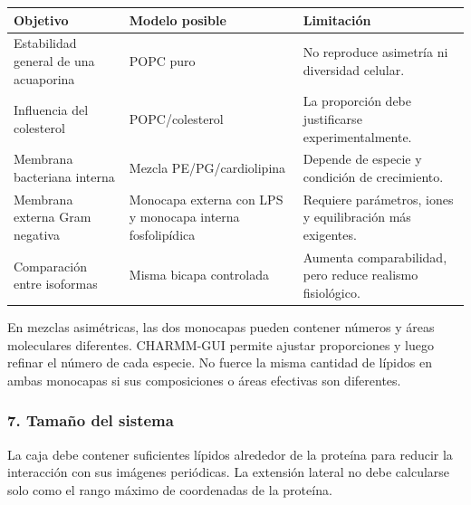 \documentclass[
  spanish,
  11pt,
  a4paper]{article}
\newcounter{none} %
\begin{document}
{\def\LTcaptype{none} %
\begin{longtable}[]{@{}
  >{\raggedright\arraybackslash}p{}
  >{\raggedright\arraybackslash}p{}
  >{\raggedright\arraybackslash}p{}@{}}
\toprule\noalign{}
\begin{minipage}[b]{\linewidth}\raggedright
Objetivo
\end{minipage} & \begin{minipage}[b]{\linewidth}\raggedright
Modelo posible
\end{minipage} & \begin{minipage}[b]{\linewidth}\raggedright
Limitación
\end{minipage} \\
\midrule\noalign{}
\endhead
\bottomrule\noalign{}
\endlastfoot
Estabilidad general de una acuaporina & POPC puro & No reproduce
asimetría ni diversidad celular. \\
Influencia del colesterol & POPC/colesterol & La proporción debe
justificarse experimentalmente. \\
Membrana bacteriana interna & Mezcla PE/PG/cardiolipina & Depende de
especie y condición de crecimiento. \\
Membrana externa Gram negativa & Monocapa externa con LPS y monocapa
interna fosfolipídica & Requiere parámetros, iones y equilibración más
exigentes. \\
Comparación entre isoformas & Misma bicapa controlada & Aumenta
comparabilidad, pero reduce realismo fisiológico. \\
\end{longtable}
}

En mezclas asimétricas, las dos monocapas pueden contener números y
áreas moleculares diferentes. CHARMM-GUI permite ajustar proporciones y
luego refinar el número de cada especie. No fuerce la misma cantidad de
lípidos en ambas monocapas si sus composiciones o áreas efectivas son
diferentes.

\subsubsection{7. Tamaño del sistema}\label{tamauxf1o-del-sistema}

La caja debe contener suficientes lípidos alrededor de la proteína para
reducir la interacción con sus imágenes periódicas. La extensión lateral
no debe calcularse solo como el rango máximo de coordenadas de la
proteína.
\end{document}
